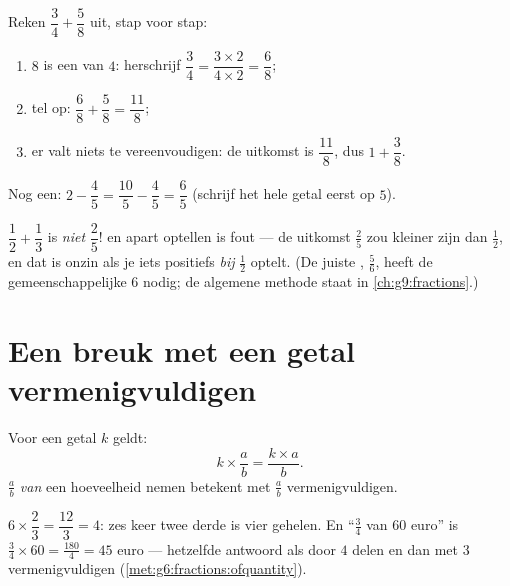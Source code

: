 \begin{example}\label{ex:g7:fractions:add}
Reken $\dfrac{3}{4} + \dfrac{5}{8}$ uit, stap voor stap:
\begin{enumerate}
  \item $8$ is een  van $4$: herschrijf
        $\dfrac34 = \dfrac{3 \times 2}{4 \times 2} = \dfrac{6}{8}$;
  \item tel op: $\dfrac{6}{8} + \dfrac{5}{8} = \dfrac{11}{8}$;
  \item er valt niets te vereenvoudigen: de uitkomst is $\dfrac{11}{8}$, dus
        $1 + \dfrac38$.
\end{enumerate}
Nog een: $2 - \dfrac{4}{5} = \dfrac{10}{5} - \dfrac{4}{5} = \dfrac{6}{5}$
(schrijf het hele getal eerst op  $5$).
\end{example}

\begin{example}\label{ex:g7:fractions:trap}
$\dfrac12 + \dfrac13$ is \emph{niet} $\dfrac{2}{5}$!  en  apart
optellen is fout --- de uitkomst $\frac25$ zou kleiner zijn dan $\frac12$, en dat
is onzin als je iets positiefs \emph{bij} $\frac12$ optelt. (De juiste ,
$\frac56$, heeft de gemeenschappelijke  $6$ nodig; de algemene methode staat
in \cref{ch:g9:fractions}.)
\end{example}

\section{Een breuk met een getal vermenigvuldigen}

\begin{proposition}\label{prop:g7:fractions:mult}
Voor een getal $k$ geldt:
\[
k \times \frac{a}{b} = \frac{k \times a}{b} .
\]
$\frac ab$ \emph{van} een hoeveelheid nemen betekent met $\frac ab$
vermenigvuldigen.
\end{proposition}
\admitted

\begin{example}\label{ex:g7:fractions:mult}
$6 \times \dfrac{2}{3} = \dfrac{12}{3} = 4$: zes keer twee derde is vier gehelen.
En ``$\frac34$ van $60$ euro'' is $\frac34 \times 60 = \frac{180}{4} = 45$ euro
--- hetzelfde antwoord als door $4$ delen en dan met $3$ vermenigvuldigen
(\cref{met:g6:fractions:ofquantity}).
\end{example}

